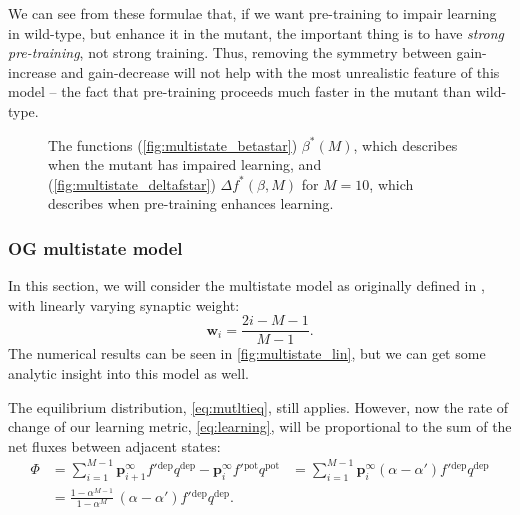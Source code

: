 \documentclass[12pt]{article}
\newcommand{\pr}{\mathbf{p}}
\newcommand{\eq}{\pr^\infty}
\newcommand{\w}{\mathbf{w}}
\newcommand{\pot}{^{\text{pot}}}
\newcommand{\dep}{^{\text{dep}}}
\begin{document}
We can see from these formulae that, if we want pre-training to impair learning in wild-type, but enhance it in the mutant, the important thing is to have \emph{strong pre-training}, not strong training.
Thus, removing the symmetry between gain-increase and gain-decrease will not help with the most unrealistic feature of this model -- the fact that pre-training proceeds much faster in the mutant than wild-type.


\begin{figure}
 \begin{center}
 \begin{myenuma}
  \item{}\label{fig:multistate_betastar}
  \item{}\label{fig:multistate_deltafstar}
 \end{myenuma}
 \end{center}
  \caption[The functions $\beta^*(M)$ and $\Delta f^*(\beta,M)$]{The functions (\ref{fig:multistate_betastar}) $\beta^*(M)$, which describes when the mutant has impaired learning, and (\ref{fig:multistate_deltafstar}) $\Delta f^*(\beta,M)$ for $M=10$, which describes when pre-training enhances learning.}\label{fig:multistate_star}
\end{figure}



\subsubsection{OG multistate model}\label{sec:multistate_lin}



In this section, we will consider the multistate model as originally defined in \cite{amit1994learning}, \ie with linearly varying synaptic weight:
%
\begin{equation}\label{eq:multistateLinWeight}
  \w_i = \frac{2i-M-1}{M-1}.
\end{equation}
%
The numerical results can be seen in \autoref{fig:multistate_lin}, but we can get some analytic insight into this model as well.


The equilibrium distribution, \eqref{eq:mutltieq}, still applies.
However, now the rate of change of our learning metric, \eqref{eq:learning}, will be proportional to the sum of the net fluxes between adjacent states:
%
\begin{equation}\label{eq:multiLinFlux}
  \begin{aligned}
    \Phi &= \sum_{i=1}^{M-1} \eq_{i+1} f'{}\dep q\dep - \eq_i f'{}\pot q\pot
         &= \sum_{i=1}^{M-1} \eq_i (\alpha-\alpha') f'{}\dep q\dep \\
         &= \frac{1-\alpha^{M-1}}{1-\alpha^M} \, (\alpha-\alpha') f'{}\dep q\dep.
  \end{aligned}
\end{equation}
%
\end{document}
